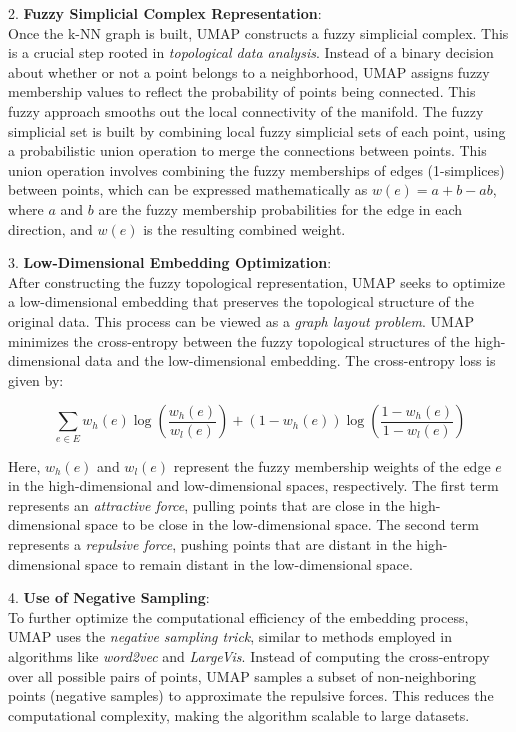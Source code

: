 2. \textbf{Fuzzy Simplicial Complex Representation}:\\
Once the k-NN graph is built, UMAP constructs a fuzzy simplicial complex. This is a crucial step rooted in \textit{topological data analysis}. Instead of a binary decision about whether or not a point belongs to a neighborhood, UMAP assigns fuzzy membership values to reflect the probability of points being connected. This fuzzy approach smooths out the local connectivity of the manifold. The fuzzy simplicial set is built by combining local fuzzy simplicial sets of each point, using a probabilistic union operation to merge the connections between points. This union operation involves combining the fuzzy memberships of edges (1-simplices) between points, which can be expressed mathematically as $w(e) = a + b - ab$, where $a$ and $b$ are the fuzzy membership probabilities for the edge in each direction, and $w(e)$ is the resulting combined weight.

3. \textbf{Low-Dimensional Embedding Optimization}:\\
After constructing the fuzzy topological representation, UMAP seeks to optimize a low-dimensional embedding that preserves the topological structure of the original data. This process can be viewed as a \textit{graph layout problem}. UMAP minimizes the cross-entropy between the fuzzy topological structures of the high-dimensional data and the low-dimensional embedding. The cross-entropy loss is given by:

\[
    \sum_{e \in E} w_h(e) \log \left( \frac{w_h(e)}{w_l(e)} \right) + (1 - w_h(e)) \log \left( \frac{1 - w_h(e)}{1 - w_l(e)} \right)
\]

Here, $w_h(e)$ and $w_l(e)$ represent the fuzzy membership weights of the edge $e$ in the high-dimensional and low-dimensional spaces, respectively. The first term represents an \textit{attractive force}, pulling points that are close in the high-dimensional space to be close in the low-dimensional space. The second term represents a \textit{repulsive force}, pushing points that are distant in the high-dimensional space to remain distant in the low-dimensional space.

4. \textbf{Use of Negative Sampling}:\\
To further optimize the computational efficiency of the embedding process, UMAP uses the \textit{negative sampling trick}, similar to methods employed in algorithms like \textit{word2vec} and \textit{LargeVis}. Instead of computing the cross-entropy over all possible pairs of points, UMAP samples a subset of non-neighboring points (negative samples) to approximate the repulsive forces. This reduces the computational complexity, making the algorithm scalable to large datasets.

